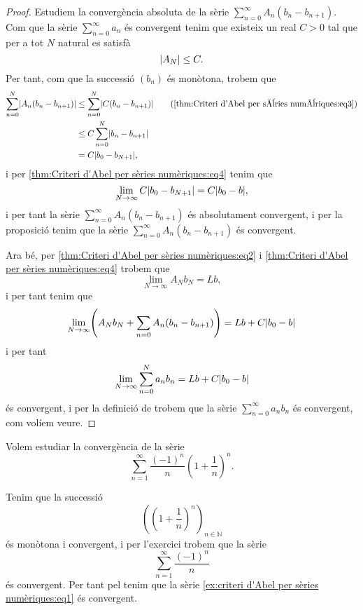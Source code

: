 \documentclass[../../Main.tex]{subfiles}
\begin{document}
\begin{theorem}
\begin{proof}
			Estudiem la convergència absoluta de la sèrie \(\sum_{n=0}^{\infty}A_{n}(b_{n}-b_{n+1})\). Com que la sèrie \(\sum_{n=0}^{\infty}a_{n}\) és convergent tenim que existeix un real \(C>0\) tal que per a tot \(N\) natural es satisfà
			\begin{equation}
				\label{thm:Criteri d'Abel per sèries numèriques:eq3}
				\abs{A_{N}}\leq C.
			\end{equation}
			Per tant, com que la successió \((b_{n})\) és monòtona, trobem que
			\begin{align*}
				\sum_{n=0}^{N}\abs{A_{n}(b_{n}-b_{n+1})}&\leq\sum_{n=0}^{N}\abs{C(b_{n}-b_{n+1})} \tag{\ref{thm:Criteri d'Abel per sèries numèriques:eq3}}\\
				&\leq C\sum_{n=0}^{N}\abs{b_{n}-b_{n+1}} \\
				&=C\abs{b_{0}-b_{N+1}},
			\end{align*}
			i per \eqref{thm:Criteri d'Abel per sèries numèriques:eq4} tenim que
			\[\lim_{N\to\infty}C\abs{b_{0}-b_{N+1}}=C\abs{b_{0}-b},\]
			i per tant la sèrie \(\sum_{n=0}^{\infty}A_{n}(b_{n}-b_{n+1})\) és absolutament convergent, %
			i per la proposició  tenim que la sèrie \(\sum_{n=0}^{\infty}A_{n}(b_{n}-b_{n+1})\) és convergent.
			
			Ara bé, per \eqref{thm:Criteri d'Abel per sèries numèriques:eq2} i \eqref{thm:Criteri d'Abel per sèries numèriques:eq4} trobem que
			\[\lim_{N\to\infty}A_{N}b_{N}=Lb,\]
			i per tant tenim que
			\[\lim_{N\to\infty}\left(A_{N}b_{N}+\sum_{n=0}A_{n}(b_{n}-b_{n+1})\right)=Lb+C\abs{b_{0}-b}\]
			i per tant
			\[\lim_{N\to\infty}\sum_{n=0}^{N}a_{n}b_{n}=Lb+C\abs{b_{0}-b}\]
			és convergent, i per la definició de  trobem que la sèrie \(\sum_{n=0}^{\infty}a_{n}b_{n}\) és convergent, com volíem veure.
		\end{proof}
	\end{theorem}
	\begin{example}
		\label{ex:criteri d'Abel per sèries numèriques}
		Volem estudiar la convergència de la sèrie
		\begin{equation}
			\label{ex:criteri d'Abel per sèries numèriques:eq1}
			\sum_{n=1}^{\infty}\frac{(-1)^{n}}{n}\left(1+\frac{1}{n}\right)^{n}.
		\end{equation}
		\begin{solution}
			Tenim que la successió %
			\[\left(\left(1+\frac{1}{n}\right)^{n}\right)_{n\in\mathbb{N}}\]
			és monòtona i convergent, i per l'exercici  trobem que la sèrie
			\[\sum_{n=1}^{\infty}\frac{(-1)^{n}}{n}\]
			és convergent. Per tant pel  tenim que la sèrie \eqref{ex:criteri d'Abel per sèries numèriques:eq1} és convergent.
		\end{solution}
	\end{example}	
\end{document}
